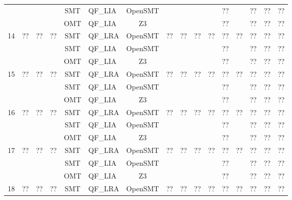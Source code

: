\begin{landscape}
\begin{table}[H]
\begin{tabular}{|c|c|c|c|c|l|c|c|c|c|c|c|c|c|c|c|}
            & & & & SMT & QF\_LIA & OpenSMT & & & & & ?? & & ?? & ?? & ?? \\
            & & & & OMT & QF\_LIA & Z3 & & & & & ?? & & ?? & ?? & ?? \\
            \hline
            \multirow{3}{*}{14} & \multirow{3}{*}{??} & \multirow{3}{*}{??} & \multirow{3}{*}{??} & SMT & QF\_LRA & OpenSMT & \multirow{3}{*}{??} & \multirow{3}{*}{??} & \multirow{3}{*}{??} & \multirow{3}{*}{??} & ?? & \multirow{3}{*}{??} & ?? & ?? & ?? \\
            & & & & SMT & QF\_LIA & OpenSMT & & & & & ?? & & ?? & ?? & ?? \\
            & & & & OMT & QF\_LIA & Z3 & & & & & ?? & & ?? & ?? & ?? \\
            \hline
            \multirow{3}{*}{15} & \multirow{3}{*}{??} & \multirow{3}{*}{??} & \multirow{3}{*}{??} & SMT & QF\_LRA & OpenSMT & \multirow{3}{*}{??} & \multirow{3}{*}{??} & \multirow{3}{*}{??} & \multirow{3}{*}{??} & ?? & \multirow{3}{*}{??} & ?? & ?? & ?? \\
            & & & & SMT & QF\_LIA & OpenSMT & & & & & ?? & & ?? & ?? & ?? \\
            & & & & OMT & QF\_LIA & Z3 & & & & & ?? & & ?? & ?? & ?? \\
            \hline
            \multirow{3}{*}{16} & \multirow{3}{*}{??} & \multirow{3}{*}{??} & \multirow{3}{*}{??} & SMT & QF\_LRA & OpenSMT & \multirow{3}{*}{??} & \multirow{3}{*}{??} & \multirow{3}{*}{??} & \multirow{3}{*}{??} & ?? & \multirow{3}{*}{??} & ?? & ?? & ?? \\
            & & & & SMT & QF\_LIA & OpenSMT & & & & & ?? & & ?? & ?? & ?? \\
            & & & & OMT & QF\_LIA & Z3 & & & & & ?? & & ?? & ?? & ?? \\
            \hline
            \multirow{3}{*}{17} & \multirow{3}{*}{??} & \multirow{3}{*}{??} & \multirow{3}{*}{??} & SMT & QF\_LRA & OpenSMT & \multirow{3}{*}{??} & \multirow{3}{*}{??} & \multirow{3}{*}{??} & \multirow{3}{*}{??} & ?? & \multirow{3}{*}{??} & ?? & ?? & ?? \\
            & & & & SMT & QF\_LIA & OpenSMT & & & & & ?? & & ?? & ?? & ?? \\
            & & & & OMT & QF\_LIA & Z3 & & & & & ?? & & ?? & ?? & ?? \\
            \hline
            \multirow{3}{*}{18} & \multirow{3}{*}{??} & \multirow{3}{*}{??} & \multirow{3}{*}{??} & SMT & QF\_LRA & OpenSMT & \multirow{3}{*}{??} & \multirow{3}{*}{??} & \multirow{3}{*}{??} & \multirow{3}{*}{??} & ?? & \multirow{3}{*}{??} & ?? & ?? & ?? \\

\end{tabular}
\end{table}
\end{landscape}
